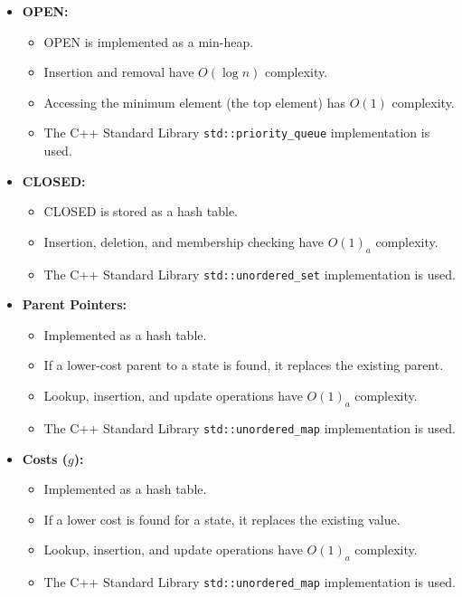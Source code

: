\documentclass[11pt]{article}
\begin{document}
\begin{itemize}
  \item \textbf{OPEN:}
        \begin{itemize}
          \item OPEN is implemented as a min-heap.
          \item Insertion and removal have \(O(\log n)\) complexity.
          \item Accessing the minimum element (the top element) has \(O(1)\) complexity.
          \item The C++ Standard Library \texttt{std::priority\_queue} implementation is used.
        \end{itemize}

  \item \textbf{CLOSED:}
        \begin{itemize}
          \item CLOSED is stored as a hash table.
          \item Insertion, deletion, and membership checking have
                \(O(1)_a\) complexity.
          \item The C++ Standard Library \texttt{std::unordered\_set} implementation is used.
        \end{itemize}

  \item \textbf{Parent Pointers:}
        \begin{itemize}
          \item Implemented as a hash table.
          \item If a lower-cost parent to a state is found, it replaces the existing parent.
          \item Lookup, insertion, and update operations have
                \(O(1)_a\) complexity.
          \item The C++ Standard Library \texttt{std::unordered\_map} implementation is used.
        \end{itemize}

  \item \textbf{Costs (\(g\)):}
        \begin{itemize}
          \item Implemented as a hash table.
          \item If a lower cost is found for a state, it replaces the existing
                value.
          \item Lookup, insertion, and update operations have
                \(O(1)_a\) complexity.
          \item The C++ Standard Library \texttt{std::unordered\_map} implementation is used.
        \end{itemize}


\end{itemize}
\end{document}
